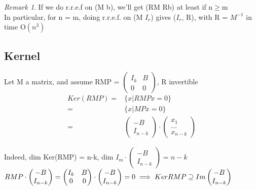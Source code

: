 \documentclass{article}
\theoremstyle{definition}
\theoremstyle{remark}
\newtheorem*{remark}{Remark}
\begin{document}
	\begin{remark}
		If we do r.r.e.f on (M b), we'll get (RM Rb) at least if n$\geq$m\\
		In particular, for n = m, doing r.r.e.f. on (M $I_r$) gives ($I_r$, R), with R = $M^{-1}$ in time O$(n^3)$
	\end{remark}
	
	\subsection{Kernel}
	Let M a matrix, and assume RMP = $\begin{pmatrix}
	I_k&B\\0&0
	\end{pmatrix}$, R invertible
	\begin{align*}
	Ker(RMP) =& \{x | RMPx = 0\}\\
	=& \{x | MPx = 0\}\\
	=&\begin{pmatrix}
	-B\\I_{n-k}
	\end{pmatrix}\cdot\begin{pmatrix}
	x_1\\\dots\\x_{n-k}
	\end{pmatrix}
	\end{align*}
	
	Indeed, dim Ker(RMP) = n-k, dim $I_m\cdot\begin{pmatrix}
	-B\\I_{n-k}
	\end{pmatrix} = n-k$\\
	
	$RMP\cdot\begin{pmatrix}
	-B\\I_{n-k}
	\end{pmatrix} = \begin{pmatrix}
	I_k&B\\0&0
	\end{pmatrix}\cdot\begin{pmatrix}
	-B\\I_{n-k}
	\end{pmatrix} = 0\\
	\implies Ker RMP \supseteq Im\begin{pmatrix}
	-B\\I_{n-k}
	\end{pmatrix}$
	
\end{document}
